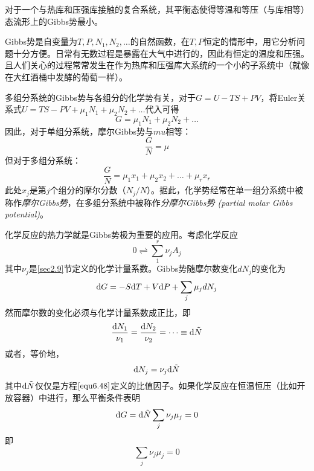 对于一个与热库和压强库接触的复合系统，其平衡态使得等温和等压（与库相等）态流形上的Gibbs势最小。

Gibbs势是自变量为$T, P, N_1, N_2, \dots$的自然函数，在$T, P$恒定的情形中，用它分析问题十分方便。日常有无数过程是暴露在大气中进行的，因此有恒定的温度和压强。且人们关心的过程常常发生在作为热库和压强库大系统的一个小的子系统中（就像在大红酒桶中发酵的葡萄一样）。

多组分系统的Gibbs势与各组分的化学势有关，对于$G = U - TS + PV$，将Euler关系式$U = TS - PV + \mu_1 N_1 + \mu_2 N_2 + \dots$代入可得
\begin{equation}
\label{equ6.43}
	G = \mu_1 N_1 + \mu_2 N_2 + \dots
\end{equation}
因此，对于单组分系统，摩尔Gibbs势与$mu$相等：
\begin{equation}
\label{equ6.44}
	\frac{G}{N} = \mu
\end{equation}
但对于多组分系统：
\begin{equation}
\label{equ6.45}
	\frac{G}{N}=\mu_1x_1+\mu_2x_2+ \dots +\mu_{r}x_{r}
\end{equation}
此处$x_j$是第$j$个组分的摩尔分数（$N_j/N$）。据此，化学势经常在单一组分系统中被称作{\it 摩尔Gibbs势}，在多组分系统中被称作{\it 分摩尔Gibbs势 (partial molar Gibbs potential)}。

化学反应的热力学就是Gibbs势极为重要的应用。考虑化学反应
\begin{equation}
\label{equ6.46}
	0 \rightleftharpoons \sum_{1}^{r} \nu_j A_j
\end{equation}
其中$\nu_j$是\ref{sec2.9}节定义的化学计量系数。Gibbs势随摩尔数变化$dN_j$的变化为
\begin{equation}
\label{equ6.47}
	\mathrm{d} G = -S \mathrm{d} T + V \mathrm{d} P + \sum_j \mu_j dN_j
\end{equation}
然而摩尔数的变化必须与化学计量系数成正比，即
\begin{equation}
\label{equ6.48}
	\frac{\mathrm{d} N_1}{\nu_1}=\frac{\mathrm{d} N_2}{\nu_2}= \dots \equiv \mathrm{d} \tilde{N}
\end{equation}
或者，等价地，
\begin{equation}
\label{equ6.49}
	\mathrm{d} N_j = \nu_j \mathrm{d} \tilde{N}
\end{equation}
其中$\mathrm{d} \tilde{N}$仅仅是方程$\eqref{equ6.48}$定义的比值因子。如果化学反应在恒温恒压（比如开放容器）中进行，那么平衡条件表明
\begin{equation}
\label{equ6.50}
	\mathrm{d} G = \mathrm{d} \tilde{N} \sum_{j}\nu_{j}\mu_{j} = 0
\end{equation}
即
\begin{equation}
\label{equ6.51}
	\sum_{j} \nu_{j} \mu_{j}=0
\end{equation}


